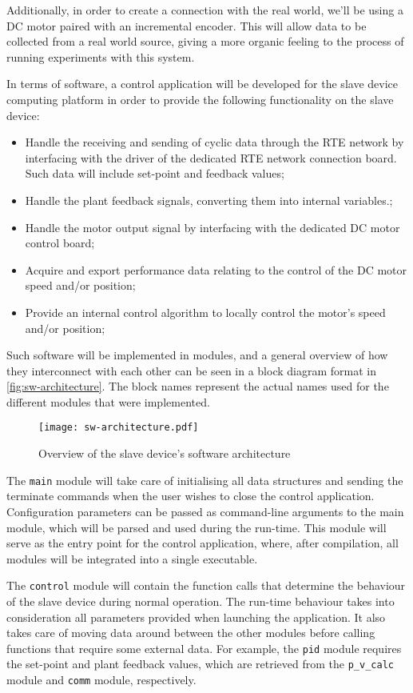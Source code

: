 Additionally, in order to create a connection with the real world, we'll be using a DC motor paired with an incremental encoder.
This will allow data to be collected from a real world source, giving a more organic feeling to the process of running experiments with this system.

In terms of software, a control application will be developed for the slave device computing platform in order to provide the following functionality on the slave device:
\begin{itemize}
	\item Handle the receiving and sending of cyclic data through the RTE network by interfacing with the driver of the dedicated RTE network connection board. Such data will include set-point and feedback values;
	\item Handle the plant feedback signals, converting them into internal variables.;
	\item Handle the motor output signal by interfacing with the dedicated DC motor control board;
	\item Acquire and export performance data relating to the control of the DC motor speed and/or position;
	\item Provide an internal control algorithm to locally control the motor's speed and/or position;
\end{itemize}

Such software will be implemented in modules, and a general overview of how they interconnect with each other can be seen in a block diagram format in \autoref{fig:sw-architecture}.
The block names represent the actual names used for the different modules that were implemented.

\begin{figure}
	\centering
	\texttt{[image: sw-architecture.pdf]}
	\caption{Overview of the slave device's software architecture}
	\label{fig:sw-architecture}
\end{figure}

The \verb|main| module will take care of initialising all data structures and sending the terminate commands when the user wishes to close the control application.
Configuration parameters can be passed as command-line arguments to the main module, which will be parsed and used during the run-time.
This module will serve as the entry point for the control application, where, after compilation, all modules will be integrated into a single executable.

The \verb|control| module will contain the function calls that determine the behaviour of the slave device during normal operation.
The run-time behaviour takes into consideration all parameters provided when launching the application.
It also takes care of moving data around between the other modules before calling functions that require some external data.
For example, the \verb|pid| module requires the set-point and plant feedback values, which are retrieved from the \verb|p_v_calc| module and \verb|comm| module, respectively.

